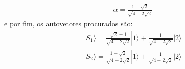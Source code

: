 \begin{prob}
\begin{sol}
\begin{enumerate}[label=\alph *)]
\begin{align}
\begin{split}
							\end{split}
						\end{align}
						\begin{align}
							\boxed{\alpha = \frac{1-\sqrt{2}}{\sqrt{4-2\sqrt{2}}}}
						\end{align}
						e por fim, os autovetores procurados são:
						\begin{align}
							\boxed{
								|{S_{1}}\rangle = \frac{\sqrt{2}+1}{\sqrt{4+2\sqrt{2}}}|{1}\rangle+\frac{1}{\sqrt{4+2\sqrt{2}}}|{2}\rangle
							}
						\end{align}
						\begin{align}
								\boxed{
									|{S_{2}}\rangle = \frac{1-\sqrt{2}}{\sqrt{4-2\sqrt{2}}}|{1}\rangle+\frac{1}{\sqrt{4-2\sqrt{2}}}|{2}\rangle
								}
						\end{align}


		 	\end{enumerate}	
		 \end{sol}
	 \end{prob}

